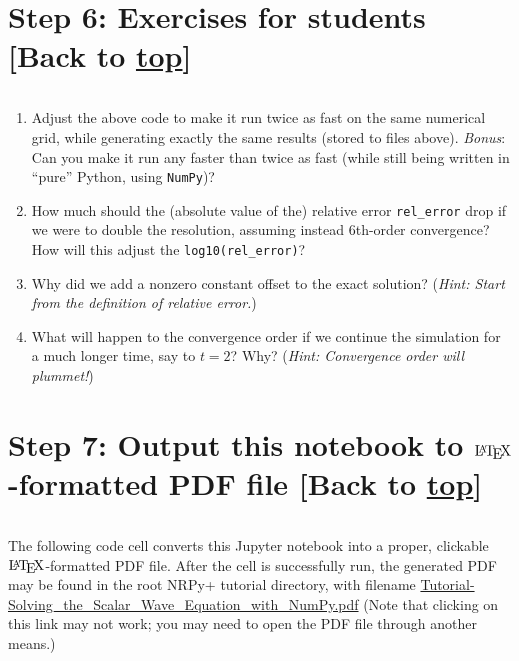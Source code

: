 \documentclass[landscape,letterpaper,10pt,english]{article}
\providecommand{\tightlist}{%
      \setlength{\itemsep}{0pt}\setlength{\parskip}{0pt}}
\let\Oldlatex\LaTeX
\renewcommand{\LaTeX}{\textrm{\Oldlatex}}
\begin{document}
    \hypertarget{step-6-exercises-for-students-back-to-top}{%
\section{\texorpdfstring{Step 6: Exercises for students {[}Back to
\hyperref[toc]{top}{]}}{Step 6: Exercises for students {[}Back to {]}}}\label{step-6-exercises-for-students-back-to-top}}

\[\label{student_exercises}\]

\begin{enumerate}
\def\labelenumi{\arabic{enumi}.}
\tightlist
\item
  Adjust the above code to make it run twice as fast on the same
  numerical grid, while generating exactly the same results (stored to
  files above). \emph{Bonus}: Can you make it run any faster than twice
  as fast (while still being written in ``pure'' Python, using
  \texttt{NumPy})?
\item
  How much should the (absolute value of the) relative error
  \texttt{\textbar{}rel\_error\textbar{}} drop if we were to double the
  resolution, assuming instead 6th-order convergence? How will this
  adjust the \texttt{log10(\textbar{}rel\_error\textbar{})}?
\item
  Why did we add a nonzero constant offset to the exact solution?
  (\emph{Hint: Start from the definition of relative error.})
\item
  What will happen to the convergence order if we continue the
  simulation for a much longer time, say to \(t=2\)? Why? (\emph{Hint:
  Convergence order will plummet!})
\end{enumerate}

    \hypertarget{step-7-output-this-notebook-to-latex-formatted-pdf-file-back-to-top}{%
\section{\texorpdfstring{Step 7: Output this notebook to
\(\LaTeX\)-formatted PDF file {[}Back to
\hyperref[toc]{top}{]}}{Step 7: Output this notebook to \textbackslash LaTeX-formatted PDF file {[}Back to {]}}}\label{step-7-output-this-notebook-to-latex-formatted-pdf-file-back-to-top}}

\[\label{latex_pdf_output}\]

The following code cell converts this Jupyter notebook into a proper,
clickable \(\LaTeX\)-formatted PDF file. After the cell is successfully
run, the generated PDF may be found in the root NRPy+ tutorial
directory, with filename
\url{Tutorial-Solving_the_Scalar_Wave_Equation_with_NumPy.pdf} (Note
that clicking on this link may not work; you may need to open the PDF
file through another means.)
\end{document}
